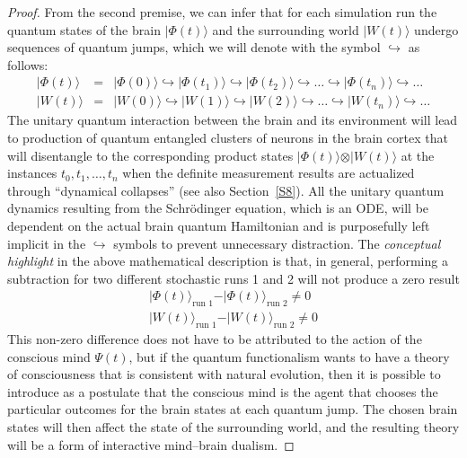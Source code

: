 \documentclass{ws-ijmpb}
\begin{document}
\begin{proof}
From the second premise, we can infer that for each simulation run
the quantum states of the brain $\vert \Phi(t)\rangle$ and the surrounding
world $\vert W(t)\rangle$ undergo sequences of quantum jumps, which we
will denote with the symbol $\hookrightarrow$ as follows:
\begin{eqnarray}
\vert \Phi(t)\rangle & = &\vert \Phi(0)\rangle\hookrightarrow\vert \Phi(t_1)\rangle\hookrightarrow\vert \Phi(t_2)\rangle\hookrightarrow\ldots\hookrightarrow\vert \Phi(t_{n})\rangle\hookrightarrow\ldots\\
\vert W(t)\rangle & = &\vert W(0)\rangle\hookrightarrow\vert W(1)\rangle\hookrightarrow\vert W(2)\rangle\hookrightarrow\ldots\hookrightarrow\vert W(t_{n})\rangle\hookrightarrow\ldots
\end{eqnarray}
The unitary quantum interaction between the brain and its environment will lead to production of quantum entangled clusters of neurons in the brain cortex that will disentangle to the corresponding product states $\vert \Phi(t)\rangle\otimes \vert W(t)\rangle$ at the instances $t_0, t_1, \ldots, t_n$ when the definite measurement results are actualized through ``dynamical collapses'' \cite{Georgiev2017} (see also Section~\ref{S8}).
All the unitary quantum dynamics resulting from the Schr\"{o}dinger equation, which is an ODE, will be dependent on the actual brain quantum Hamiltonian and is purposefully left implicit in the $\hookrightarrow$ symbols to prevent unnecessary distraction.
The \emph{conceptual highlight} in the above mathematical description is that, in general, performing a subtraction for two different stochastic
runs 1 and 2 will not produce a zero result
\begin{gather}
\vert \Phi(t)\rangle_{\textrm{run }1}-\vert \Phi(t)\rangle_{\textrm{run }2}\neq 0 \\
\vert W(t)\rangle_{\textrm{run }1}-\vert W(t)\rangle_{\textrm{run }2}\neq 0
\end{gather}
This non-zero difference does not have to be attributed to the action
of the conscious mind $\Psi(t)$, but if the quantum functionalism
wants to have a theory of consciousness that is consistent with natural
evolution, then it is possible to introduce as a postulate that the
conscious mind is the agent that chooses the particular outcomes for
the brain states at each quantum jump. The chosen brain states will
then affect the state of the surrounding world, and the resulting
theory will be a form of interactive mind--brain dualism.
\end{proof}
\end{document}
